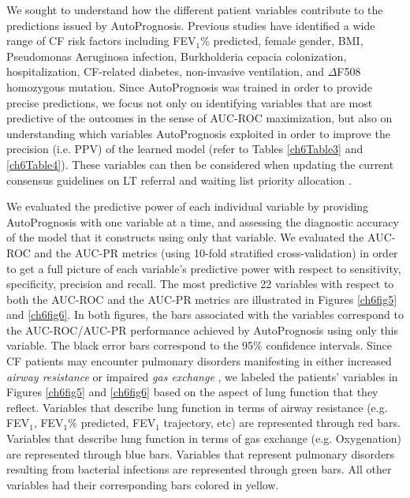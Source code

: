 \documentclass [PhD] {uclathes}
\begin{document}
We sought to understand how the different patient variables contribute to the predictions issued by AutoPrognosis. Previous studies have identified a wide range of CF risk factors including FEV$_1 \%$ predicted\cite{liou2005use,aaron2015statistical,mccarthy2013cf,nkam20173,szczesniak2017phenotypes}, female gender\cite{aaron2015statistical,szczesniak2017phenotypes}, BMI\cite{mccarthy2013cf,dimitrov2015cf}, Pseudomonas Aeruginosa infection\cite{aaron2015statistical}, Burkholderia cepacia colonization\cite{nkam20173}, hospitalization\cite{nkam20173}, CF-related diabetes\cite{chamnan2010diabetes,szczesniak2017phenotypes}, non-invasive ventilation\cite{nkam20173}, and $\Delta$F508 homozygous mutation\cite{aaron2015statistical}. Since AutoPrognosis was trained in order to provide precise predictions, we focus not only on identifying variables that are most predictive of the outcomes in the sense of AUC-ROC maximization, but also on understanding which variables AutoPrognosis exploited in order to improve the precision (i.e. PPV) of the learned model (refer to Tables \ref{ch6Table3} and \ref{ch6Table4}). These variables can then be considered when updating the current consensus guidelines on LT referral and waiting list priority allocation \cite{weill2015consensus}. 

We evaluated the predictive power of each individual variable by providing AutoPrognosis with one variable at a time, and assessing the diagnostic accuracy of the model that it constructs using only that variable. We evaluated the AUC-ROC and the AUC-PR metrics (using 10-fold stratified cross-validation) in order to get a full picture of each variable's predictive power with respect to sensitivity, specificity, precision and recall. The most predictive 22 variables with respect to both the AUC-ROC and the AUC-PR metrics are illustrated in Figures \ref{ch6fig5} and \ref{ch6fig6}. In both figures, the bars associated with the variables correspond to the AUC-ROC/AUC-PR performance achieved by AutoPrognosis using only this variable. The black error bars correspond to the 95$\%$ confidence intervals. Since CF patients may encounter pulmonary disorders manifesting in either increased {\it airway resistance} or impaired {\it gas exchange} \cite{young2011gas}, we labeled the patients' variables in Figures \ref{ch6fig5} and \ref{ch6fig6} based on the aspect of lung function that they reflect. Variables that describe lung function in terms of airway resistance (e.g. FEV$_1$, FEV$_1 \%$ predicted, FEV$_1$ trajectory, etc) are represented through red bars. Variables that describe lung function in terms of gas exchange (e.g. Oxygenation) are represented through blue bars. Variables that represent pulmonary disorders resulting from bacterial infections are represented through green bars. All other variables had their corresponding bars colored in yellow. 
\end{document}
